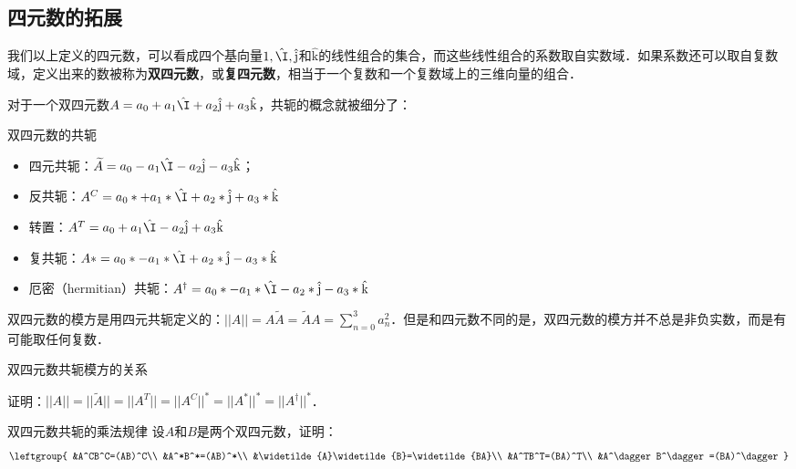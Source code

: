 \subsection{四元数的拓展}

我们以上定义的四元数，可以看成四个基向量$1, \hat{\I}, \hat{\mathrm{j}}$和$\hat{\mathrm{k}}$的线性组合的集合，而这些线性组合的系数取自实数域．如果系数还可以取自复数域，定义出来的数被称为\textbf{双四元数}，或\textbf{复四元数}，相当于一个复数和一个复数域上的三维向量的组合．

对于一个双四元数$A=a_0+a_1\hat{\I}+a_2\hat{\mathrm{j}}+a_3\hat{\mathrm{k}}$，共轭的概念就被细分了：

\begin{definition}{双四元数的共轭}
\begin{itemize}

\item 四元共轭：$\widetilde{A}=a_0-a_1\hat{\I}-a_2\hat{\mathrm{j}}-a_3\hat{\mathrm{k}}$；
\item 反共轭：$A^C=a_0*+a_1*\hat{\I}+a_2*\hat{\mathrm{j}}+a_3*\hat{\mathrm{k}}$
\item 转置：$A^T=a_0+a_1\hat{\I}-a_2\hat{\mathrm{j}}+a_3\hat{\mathrm{k}}$
\item 复共轭：$A*=a_0*-a_1*\hat{\I}+a_2*\hat{\mathrm{j}}-a_3*\hat{\mathrm{k}}$
\item 厄密（hermitian）共轭：$A^\dagger=a_0*-a_1*\hat{\I}-a_2*\hat{\mathrm{j}}-a_3*\hat{\mathrm{k}}$

\end{itemize}
\end{definition}

双四元数的模方是用四元共轭定义的：$||A||=A\widetilde{A}=\widetilde{A}A=\sum^{3}_{n=0}a^2_n$．但是和四元数不同的是，双四元数的模方并不总是非负实数，而是有可能取任何复数．

\begin{exercise}{双四元数共轭模方的关系}

证明：$||A||=||\widetilde{A}||=||A^T||=||A^C||^*=||A^*||^*=||A^\dagger||^*$．

\end{exercise}

\begin{exercise}{双四元数共轭的乘法规律}
设$A$和$B$是两个双四元数，证明：
\begin{equation}
\leftgroup{
&A^CB^C=(AB)^C\\
&A^*B^*=(AB)^*\\
&\widetilde{A}\widetilde{B}=\widetilde{BA}\\
&A^TB^T=(BA)^T\\
&A^\dagger B^\dagger=(BA)^\dagger
}
\end{equation}

\end{exercise}


